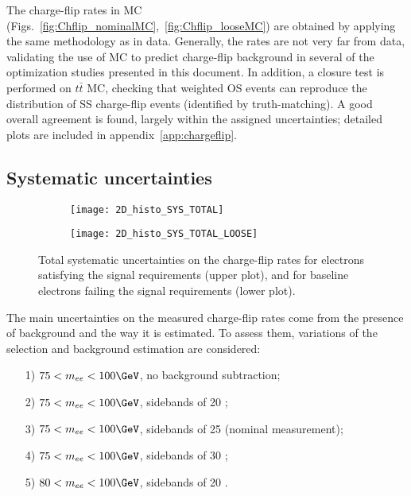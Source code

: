 The charge-flip rates in MC (Figs.~\ref{fig:Chflip_nominalMC},~\ref{fig:Chflip_looseMC}) 
are obtained by applying the same methodology as in data. 
Generally, the rates are not very far from data, validating the use of MC to predict charge-flip background 
in several of the optimization studies presented in this document. 
In addition, a closure test is performed on $t\bar t$ MC, 
checking that weighted OS events can reproduce the distribution of SS charge-flip events (identified by truth-matching). 
A good overall agreement is found, largely within the assigned uncertainties; 
detailed plots are included in appendix~\ref{app:chargeflip}. 

\subsection*{Systematic uncertainties}
\label{subsec:chargeflip_uncertainties}

\begin{figure}[t!]
\centering
\begin{subfigure}[b]{0.75\textwidth}
	\texttt{[image: 2D\_histo\_SYS\_TOTAL]}
\end{subfigure}
\begin{subfigure}[b]{0.75\textwidth}
	\texttt{[image: 2D\_histo\_SYS\_TOTAL\_LOOSE]}
\end{subfigure}
\caption{Total systematic uncertainties on the charge-flip rates for electrons satisfying the signal requirements (upper plot),
and for baseline electrons failing the signal requirements (lower plot). 
}
\label{fig:ChFlip_SYS_Total}
\end{figure}

The main uncertainties on the measured charge-flip rates come from the presence of background and the way it is estimated. To assess them, variations of the selection and background estimation are considered: 
\begin{itemize}
\item[1)] $75<m_{ee}<100 \GeV$, no background subtraction;
\item[2)] $75<m_{ee}<100 \GeV$, sidebands of 20 \GeV;
\item[3)] $75<m_{ee}<100 \GeV$, sidebands of 25 \GeV (nominal measurement);
\item[4)] $75<m_{ee}<100 \GeV$, sidebands of 30 \GeV;
\item[5)] $80<m_{ee}<100 \GeV$, sidebands of 20 \GeV.
\end{itemize}

